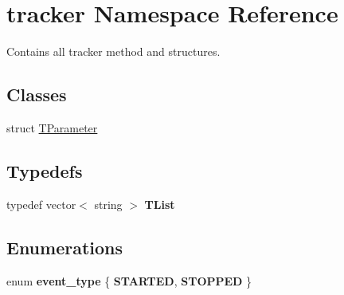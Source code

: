 \hypertarget{namespacetracker}{}\section{tracker Namespace Reference}
\label{namespacetracker}


Contains all tracker method and structures.  


\subsection*{Classes}
\begin{DoxyCompactItemize}
\item 
struct \hyperlink{structtracker_1_1TParameter}{T\+Parameter}
\end{DoxyCompactItemize}
\subsection*{Typedefs}
\begin{DoxyCompactItemize}
\item 
\mbox{\label{namespacetracker_a5c98069e9e5f8fbee2ac2ee82144347d}} 
typedef vector$<$ string $>$ {\bfseries T\+List}
\end{DoxyCompactItemize}
\subsection*{Enumerations}
\begin{DoxyCompactItemize}
\item 
\mbox{\label{namespacetracker_adad29535063afb92161f98de28f9af30}} 
enum {\bfseries event\+\_\+type} \{ {\bfseries S\+T\+A\+R\+T\+ED}, 
{\bfseries S\+T\+O\+P\+P\+ED}
 \}
\end{DoxyCompactItemize}
